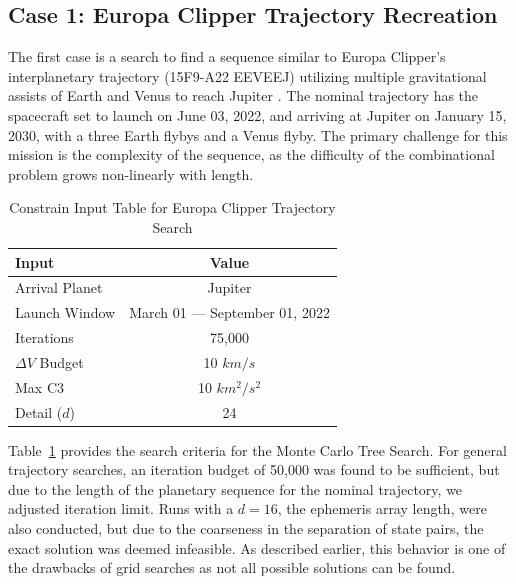 \documentclass[letterpaper, preprint, paper,11pt]{AAS}	%
\begin{document}
\subsection{Case 1: Europa Clipper Trajectory Recreation}

The first case is a search to find a sequence similar to Europa Clipper's interplanetary trajectory (15F9-A22 EEVEEJ) utilizing multiple gravitational assists of Earth and Venus to reach Jupiter \cite{Buffington2014}. The nominal trajectory has the spacecraft set to launch on June 03, 2022, and arriving at Jupiter on January 15, 2030, with a three Earth flybys and a Venus flyby. The primary challenge for this mission is the complexity of the sequence, as the difficulty of the combinational problem grows non-linearly with length.

\begin{table}[htb]
    \centering
    \caption{Constrain Input Table for Europa Clipper Trajectory Search}
    \label{table:clipInputs}
    \begin{tabular}{lc}
        \toprule
        \textbf{Input} & \textbf{Value}\\
        \midrule
        Arrival Planet & Jupiter \\
        Launch Window \hspace{1em}& March 01 --- September 01, 2022 \\
        Iterations & 75,000 \\
        $\Delta V$ Budget & 10 $km/s$ \\
        Max C3 & 10 $km^2/s^2$ \\
        Detail ($d$) & 24 \\
        \bottomrule
    \end{tabular}
\end{table}

Table~\ref*{table:clipInputs} provides the search criteria for the Monte Carlo Tree Search. For general trajectory searches, an iteration budget of 50,000 was found to be sufficient, but due to the length of the planetary sequence for the nominal trajectory, we adjusted iteration limit. Runs with a $d = 16$, the ephemeris array length, were also conducted, but due to the coarseness in the separation of state pairs, the exact solution was deemed infeasible. As described earlier, this behavior is one of the drawbacks of grid searches as not all possible solutions can be found.
\end{document}
